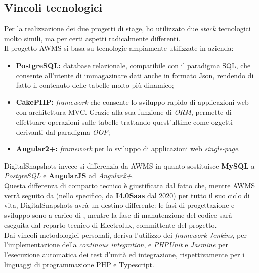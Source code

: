 \subsection{Vincoli tecnologici}

Per la realizzazione dei due progetti di stage, ho utilizzato due \textit{stack} tecnologici molto simili, ma per certi aspetti radicalmente differenti.\\
Il progetto AWMS si basa su tecnologie ampiamente utilizzate in azienda: 
\begin{itemize}
\item \textbf{PostgreSQL:} database relazionale, compatibile con il paradigma SQL, che consente all'utente di immagazinare dati anche in formato Json, rendendo di fatto il contenuto delle tabelle molto più dinamico;
\item \textbf{CakePHP:} \textit{framework} che consente lo sviluppo rapido di applicazioni web con architettura MVC. Grazie alla sua funzione di \textit{ORM}, permette di effettuare operazioni sulle tabelle trattando quest'ultime come oggetti derivanti dal paradigma \textit{OOP};
\item \textbf{Angular2+:} \textit{framework} per lo sviluppo di applicazioni web \textit{single-page}.
\end{itemize}
DigitalSnapshots invece si differenzia da AWMS in quanto sostituisce \textbf{MySQL} a \textit{PostgreSQL} e \textbf{AngularJS} ad \textit{Angular2+}.\\
Questa differenza di comparto tecnico è giustificata dal fatto che, mentre AWMS verrà seguito da \AD{} (nello specifico, da \textbf{I4.0Saas} dal 2020) per tutto il suo ciclo di vita, DigitalSnapshots avrà un destino differente: le fasi di progettazione e sviluppo sono a carico di \AD{}, mentre la fase di manutenzione del codice sarà eseguita dal reparto tecnico di Electrolux, committente del progetto.\\
Dai vincoli metodologici personali, deriva l'utilizzo dei \textit{framework} \textit{Jenkins}, per l'implementazione della \textit{continous integration}, e \textit{PHPUnit} e \textit{Jasmine} per l'esecuzione automatica dei test d'unità ed integrazione, rispettivamente per i linguaggi di programmazione PHP e Typescript.
